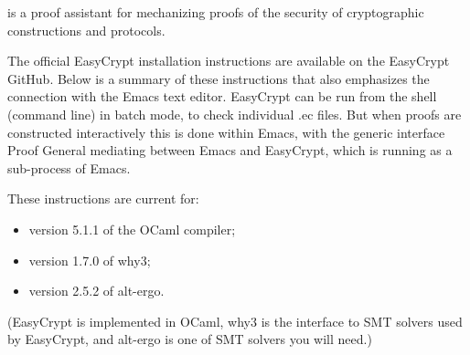 
\cite{StoughtonEasyCrypt}

\EasyCrypt is a proof assistant for mechanizing proofs of the security of cryptographic constructions and protocols.

The official EasyCrypt installation instructions are available on the EasyCrypt GitHub. Below is a summary of these instructions that also emphasizes the connection with the Emacs text editor. EasyCrypt can be run from the shell (command line) in batch mode, to check individual .ec files. But when proofs are constructed interactively this is done within Emacs, with the generic interface Proof General mediating between Emacs and EasyCrypt, which is running as a sub-process of Emacs.

These instructions are current for:
\begin{itemize}
	\item version 5.1.1 of the OCaml compiler;
	\item version 1.7.0 of \textsf{why3};
	\item version 2.5.2 of \textsf{alt-ergo}.
\end{itemize}

(EasyCrypt is implemented in OCaml, \textsf{why3} is the interface to SMT solvers used by EasyCrypt, and \textsf{alt-ergo} is one of SMT solvers you will need.) 

%
%
%
